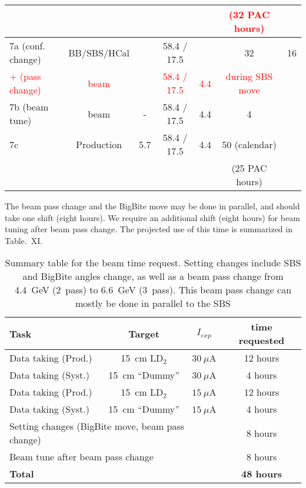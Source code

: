 \begin{table}[h]
\begin{tabular}{|l|c|c|c|c|c|c|}
&  &  &  &  & \textcolor{red}{(32 PAC hours)} &  \\
\hline
\hline
7a (conf. change) & BB/SBS/HCal &  & 58.4 / 17.5 &  & 32 & 16 \\
\textcolor{red}{+ (pass change)} &  \textcolor{red}{beam} &  & \textcolor{red}{58.4 / 17.5} & \textcolor{red}{4.4} & \textcolor{red}{during SBS move} & \\
7b (beam tune) & beam & - & 58.4 / 17.5 & 4.4 & 4 &  \\
7c  & Production & 5.7 & 58.4 / 17.5 & 4.4 & 50 (calendar) &  \\
 &  &  &  &  & (25 PAC hours) &  \\
\hline
\end{tabular} 
\end{table}
%
The beam pass change and the BigBite move may be done in parallel, and should take one shift (eight hours). We require an additional shift (eight hours) for beam tuning after beam pass change. 
The projected use of this time is summarized in Table.~XI.%
%
\begin{table}[h]
\caption{Summary table for the beam time request. Setting changes include SBS and BigBite angles change, as well as a beam pass change from 4.4~GeV (2~pass) to 6.6~GeV (3~pass). This beam pass change can mostly be done in parallel to the SBS}
\label{tab:beamtime}
\centering
\begin{tabular}{|l|c|c|c|}
\hline
Task & Target & $I_{exp}$ & time requested \\
\hline
Data taking (Prod.) & 15~cm LD$_2$ & $30~\mu$A & 12 hours \\ 
\hline
Data taking (Syst.) & 15~cm ``Dummy'' & $30~\mu$A & 4 hours \\ 
\hline
Data taking (Prod.) & 15~cm LD$_2$ & $15~\mu$A & 12 hours \\ 
\hline
Data taking (Syst.) & 15~cm ``Dummy'' & $15~\mu$A & 4 hours \\ 
\hline
\multicolumn{3}{|l|}{Setting changes (BigBite move, beam pass change)} & 8 hours \\
\multicolumn{3}{|l|}{Beam tune after beam pass change} & 8 hours \\
\hline
\hline
\multicolumn{3}{|l|}{\bf Total} & {\bf 48 hours} \\ 
\hline
\end{tabular} 
\end{table}

